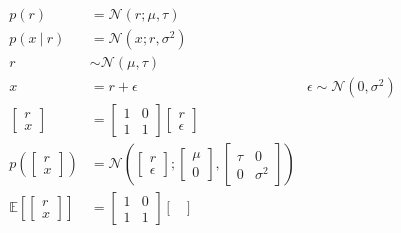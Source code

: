 \documentclass[a4paper, 12pt]{article}
\begin{document}
                \begin{align}
                    p(r) & = \mathcal{N}(r; \mu, \tau) \\
                    p(x\ |\ r) & = \mathcal{N}(x; r, \sigma^2) \\
                    r & \sim \mathcal{N}(\mu, \tau) \\
                    x & = r + \epsilon & \epsilon \sim \mathcal{N}(0, \sigma^2) \\
                    \begin{bmatrix}
                        r \\ x
                    \end{bmatrix} & = \begin{bmatrix}
                        1 & 0 \\
                        1 & 1
                    \end{bmatrix} \begin{bmatrix}
                        r \\ \epsilon
                    \end{bmatrix} \\
                    p\left(\begin{bmatrix}
                        r \\ x
                    \end{bmatrix}\right) & = \mathcal{N}\left(\begin{bmatrix}
                        r \\ \epsilon
                    \end{bmatrix}; \begin{bmatrix}
                        \mu \\ 0
                    \end{bmatrix}, \begin{bmatrix}
                        \tau & 0 \\
                        0 & \sigma^2
                    \end{bmatrix}\right) \\
                    \mathbb{E}\left[\begin{bmatrix}
                        r \\ x
                    \end{bmatrix}\right] & = \begin{bmatrix}
                        1 & 0 \\
                        1 & 1
                    \end{bmatrix} \begin{bmatrix}

\end{bmatrix}
\end{align}
\end{document}
